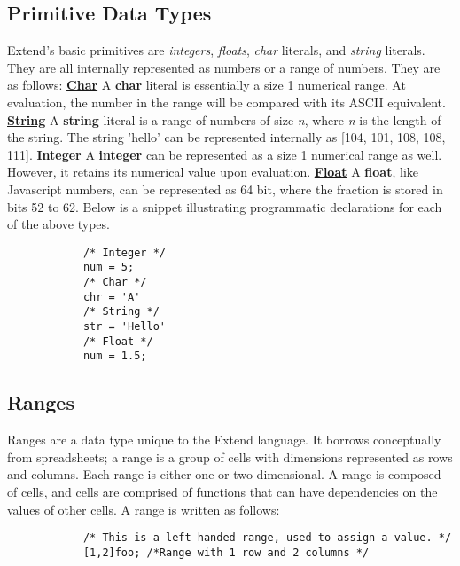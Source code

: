 	\subsection{Primitive Data Types}
		Extend's basic primitives are \textit{integers}, \textit{floats}, \textit{char} literals, and \textit{string} literals. They are all internally represented as numbers or a range of numbers. They are as follows:
		\newline
		\underline{\textbf{Char}}\newline
		A \textbf{char} literal is essentially a size 1 numerical range. At evaluation, the number in the range will be compared with its ASCII equivalent.
  		\newline
		\underline{\textbf{String}}\newline
  		A \textbf{string} literal is a range of numbers of size \textit{n}, where \textit{n} is the length of the string. The string 'hello' can be represented internally as [104, 101, 108, 108, 111].
		\newline
		\underline{\textbf{Integer}}\newline
		A \textbf{integer} can be represented as a size 1 numerical range as well. However, it retains its numerical value upon evaluation. 
		\newline
		\underline{\textbf{Float}}\newline
		A \textbf{float}, like Javascript numbers, can be represented as 64 bit, where the fraction is stored in bits 52 to 62.
		\newline
		Below is a snippet illustrating programmatic declarations for each of the above types.
  		\begin{lstlisting}
			/* Integer */
			num = 5;
			/* Char */
			chr = 'A'
			/* String */
			str = 'Hello'
			/* Float */
			num = 1.5;
  		\end{lstlisting}
	\subsection{Ranges}
		Ranges are a data type unique to the Extend language. It borrows conceptually from spreadsheets; a range is a group of cells with dimensions represented as rows and columns. Each range is either one or two-dimensional. A range is composed of cells, and cells are comprised of functions that can have dependencies on the values of other cells. 
		A range is written as follows:
		\begin{lstlisting}
			/* This is a left-handed range, used to assign a value. */
			[1,2]foo; /*Range with 1 row and 2 columns */
		\end{lstlisting}
